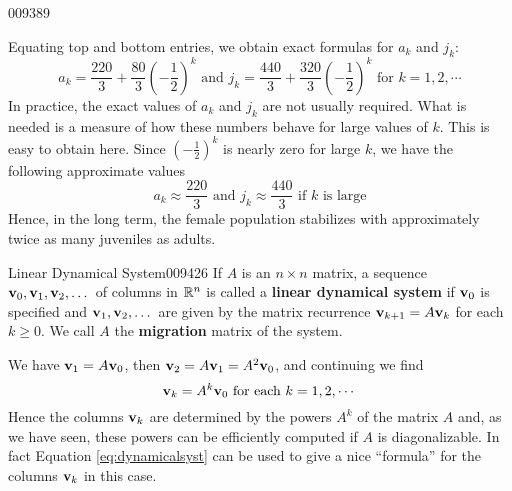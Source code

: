 \begin{example}{}{009389}
\begin{solution}
Equating top and bottom entries, we obtain exact formulas for $a_{k}$ and $j_{k}$:
\begin{equation*}
a_k = \frac{220}{3} + \frac{80}{3}\left(-\frac{1}{2}\right)^k \mbox{ and } j_k = \frac{440}{3} + \frac{320}{3}\left(-\frac{1}{2}\right)^k \mbox{ for } k = 1,2,\cdots
\end{equation*}
In practice, the exact values of $a_{k}$ and $j_{k}$ are not usually required. What is needed is a measure of how these numbers behave for large values of $k$. This is easy to obtain here. Since $(-\frac{1}{2})^{k}$ is nearly zero for large $k$, we have the following approximate values
\begin{equation*}
a_k \approx \frac{220}{3} \mbox{ and } j_k \approx \frac{440}{3} \mbox{ if } k \mbox{ is large}
\end{equation*}
Hence, in the long term, the female population stabilizes with approximately twice as many juveniles as adults.
\end{solution}
\end{example}

\begin{definition}{Linear Dynamical System}{009426}
If $A$ is an $n \times n$ matrix, a sequence $\textbf{v}_{0}, \textbf{v}_{1}, \textbf{v}_{2}, \dots$  of columns in $\mathbb{R}^n$ is called a \textbf{linear dynamical system} if $\textbf{v}_{0}$ is specified and $\textbf{v}_{1}, \textbf{v}_{2}, \dots $ are given by the matrix recurrence $\textbf{v}_{k+1}= A\textbf{v}_{k}$ for each $k \geq 0$. We call $A$ the \textbf{migration} matrix of the system. 
\end{definition}

We have $\textbf{v}_1 = A\textbf{v}_0$, then $\textbf{v}_2 = A\textbf{v}_1 = A^{2}\textbf{v}_0$, and continuing we find
\begin{equation}\label{eq:dynamicalsyst}
\textbf{v}_k = A^k \textbf{v}_0 \mbox{ for each } k = 1, 2, \cdots 
\end{equation}
Hence the columns $\textbf{v}_{k}$ are determined by the powers $A^{k}$ of the matrix $A$ and, as we have seen, these powers can be efficiently computed if $A$ is diagonalizable. In fact Equation \ref{eq:dynamicalsyst} can be used to give a nice ``formula'' for the columns $\textbf{v}_{k}$ in this case.


